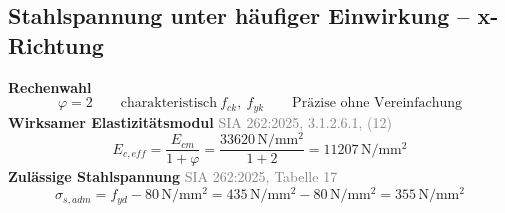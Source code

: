 \documentclass[11pt,a4paper]{article}
\newcommand{\normref}[1]{{\small\textcolor{gray}{#1}}}
\begin{document}
\subsection{Stahlspannung unter häufiger Einwirkung – x-Richtung}
\noindent\textbf{Rechenwahl}
\begin{equation*}
\varphi = 2 \qquad \text{charakteristisch}\ f_{ck},\ f_{yk} \qquad \text{Präzise ohne Vereinfachung}
\end{equation*}
\noindent\textbf{Wirksamer Elastizitätsmodul} \hfill \normref{SIA 262:2025, 3.1.2.6.1, (12)}
\begin{equation*}
E_{c,eff} = \frac{E_{cm}}{1 + \varphi} = \frac{33620\,\mathrm{N}/\mathrm{mm}^{2}}{1 + 2} = 11207\,\mathrm{N}/\mathrm{mm}^{2}
\end{equation*}
\noindent\textbf{Zulässige Stahlspannung} \hfill \normref{SIA 262:2025, Tabelle 17}
\begin{equation*}
\sigma_{s,adm} = f_{yd} - 80\,\mathrm{N}/\mathrm{mm}^{2} = 435\,\mathrm{N}/\mathrm{mm}^{2} - 80\,\mathrm{N}/\mathrm{mm}^{2} = 355\,\mathrm{N}/\mathrm{mm}^{2}
\end{equation*}
\end{document}
